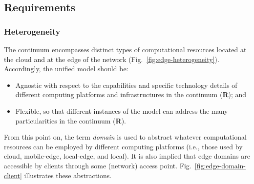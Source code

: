 \subsection{Requirements}\label{sec:requirements}


\subsubsection{Heterogeneity}

The continuum encompasses distinct types of computational resources located at the cloud and at the edge of the network (Fig.~\ref{fig:edge-heterogeneity}). Accordingly, the unified model should be:

\begin{itemize}


\item  Agnostic with respect to the capabilities and specific technology details of different computing platforms and infrastructures in the continuum (\textbf{R}); and

\item Flexible, so that different instances of the model can address the many particularities in the continuum (\textbf{R}).

\end{itemize}

From this point on, the term \textit{domain} is used to abstract whatever computational resources can be employed by different computing platforms (i.e., those used by cloud, mobile-edge, local-edge, and local). It is also implied that edge domains are accessible by clients through some (network) access point. Fig.~\ref{fig:edge-domain-client} illustrates these abstractions. 

